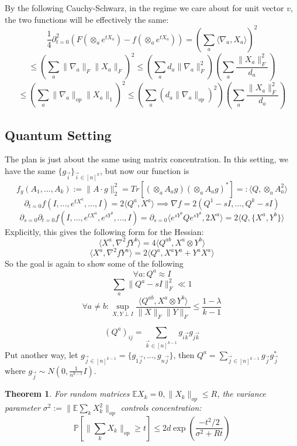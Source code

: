 \documentclass{article}
\newtheorem{theorem}{Theorem}
\newcommand{\E}{\mathbb{E}}
\renewcommand{\Pr}{\mathbb{P}}
\begin{document}
By the following Cauchy-Schwarz, in the regime we care about for unit vector $v$, the two functions will be effectively the same:
\[ \frac{1}{4}\partial_{t=0}^{2} (F(\otimes_{a} e^{tX_{a}}) - f(\otimes_{a} e^{tX_{a}})) = \left( \sum_{a} \langle \nabla_{a}, X_{a} \rangle \right)^{2}   \]
\[ \leq \left( \sum_{a} \|\nabla_{a}\|_{F} \|X_{a}\|_{F} \right)^{2} \leq \left( \sum_{a} d_{a} \|\nabla_{a}\|_{F}^{2} \right) \left( \sum_{a} \frac{\|X_{a}\|_{F}^{2}}{d_{a}} \right)   \]
\[ \leq \left( \sum_{a} \|\nabla_{a}\|_{op} \|X_{a}\|_{1} \right)^{2} \leq \left( \sum_{a} (d_{a} \|\nabla_{a}\|_{op})^{2} \right) \left( \sum_{a} \frac{\|X_{a}\|_{F}^{2}}{d_{a}} \right)  \]

\subsection{Quantum Setting}
The plan is just about the same using matrix concentration. In this setting, we have the same $\{g_{\vec{i}}\}_{\vec{i} \in [n]^{k}}$, but now our function is
\[ f_{g}(A_{1}, ..., A_{k}) := \|A \cdot g\|_{2}^{2} = Tr[ ( \otimes_{a} A_{a} g) ( \otimes_{a} A_{a} g)^{*} ] =: \langle Q, \otimes_{a} A_{a}^{2} \rangle   \]
\[ \partial_{t=0} f(I, ...,e^{tX^{a}}, ..., I) = 2 \langle Q^{a}, X^{a} \rangle \implies \nabla f = 2 (Q^{1} - sI, ..., Q^{k} - sI)    \]
\[ \partial_{s=0} \partial_{t=0} f(I, ..., e^{tX^{a}}, e^{sY^{b}}, ..., I) = \partial_{s=0} \langle e^{sY^{b}} Q e^{sY^{b}}, 2 X^{a} \rangle = 2 \langle Q, \{X^{a}, Y^{b}\} \rangle   \]
Explicitly, this gives the following form for the Hessian:
\[ \langle X^{a}, \nabla^{2} f Y^{b} \rangle = 4 \langle Q^{ab}, X^{a} \otimes Y^{b} \rangle   \]
\[ \langle X^{a}, \nabla^{2} f Y^{a} \rangle = 2 \langle Q^{a}, X^{a} Y^{a} + Y^{a} X^{a} \rangle  \]
So the goal is again to show some of the following
\[ \forall a: Q^{a} \approx I  \]
\[ \sum_{a} \|Q^{a} - sI\|_{F}^{2} \ll 1   \]
\[ \forall a \neq b: \sup_{X,Y \perp I} \frac{\langle Q^{ab}, X^{a} \otimes Y^{b} \rangle}{\|X\|_{F} \|Y\|_{F}} \leq \frac{1 - \lambda}{k-1}   \]

\[ (Q^{a})_{ij} = \sum_{\vec{k} \in [n]^{k-1}} g_{i\vec{k}} g_{j \vec{k}}  \]
Put another way, let $g_{\vec{j} \in [n]^{k-1}} = \{g_{1 \vec{j}}, ..., g_{n \vec{j}}\}$, then $Q^{a} = \sum_{\vec{j} \in [n]^{k-1}} g_{\vec{j}} g_{\vec{j}}^{*}$ where $g_{\vec{j}} \sim N(0,\frac{1}{n^{k-1}} I)$. 

\begin{theorem}
For random matrices $\E X_{k} = 0, \|X_{k}\|_{op} \leq R$, the variance parameter $\sigma^{2} := \|\E \sum_{k} X_{k}^{2} \|_{op}$ controls concentration:
\[ \Pr [ \|\sum_{k} X_{k}\|_{op} \geq t ] \leq 2 d \exp \left( \frac{-t^{2}/2}{\sigma^{2} + Rt} \right)   \]
\end{theorem}
\end{document}
